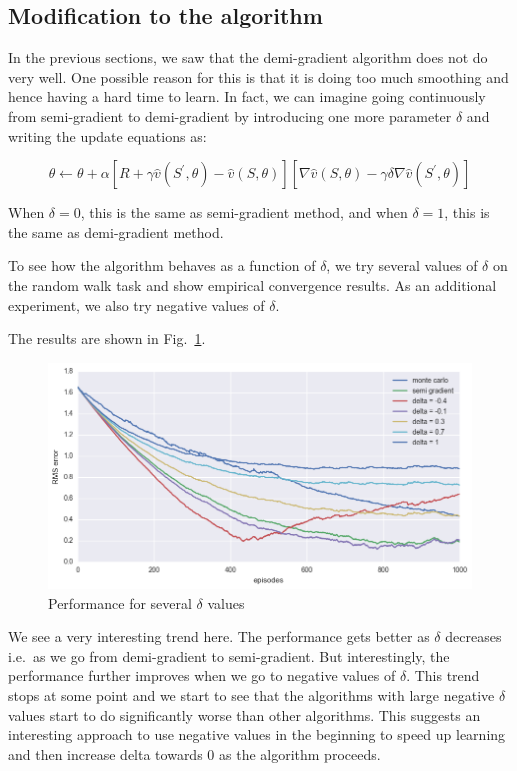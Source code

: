 \documentclass{article}
\begin{document}
\subsection{Modification to the algorithm}

    In the previous sections, we saw that the demi-gradient algorithm does not do very well. One possible reason for this is that it is doing too much smoothing and hence having a hard time to learn. In fact, we can imagine going continuously from semi-gradient to demi-gradient by introducing one more parameter $\delta$ and writing the update equations as:

    $$\theta \leftarrow \theta + \alpha \left[ R + \gamma \hat{v}(S^{'}, \theta) - \hat{v}(S, \theta) \right] \left[ \nabla \hat{v}(S, \theta) - \gamma \delta \nabla \hat{v}(S^{'}, \theta) \right]$$

    When $\delta = 0$, this is the same as semi-gradient method, and when $\delta=1$, this is the same as demi-gradient method.

    To see how the algorithm behaves as a function of $\delta$, we try several values of $\delta$ on the random walk task and show empirical convergence results. As an additional experiment, we also try negative values of $\delta$.

    The results are shown in Fig.~\ref{fig:qc2}.
    \begin{figure}
        \centering
        \includegraphics[width=\textwidth]{quant_comp2}
        \caption{Performance for several $\delta$ values}\label{fig:qc2}
    \end{figure}
    We see a very interesting trend here. The performance gets better as $\delta$ decreases i.e.\ as we go from demi-gradient to semi-gradient. But interestingly, the performance further improves when we go to negative values of $\delta$. This trend stops at some point and we start to see that the algorithms with large negative $\delta$ values start to do significantly worse than other algorithms. This suggests an interesting approach to use negative values in the beginning to speed up learning and then increase delta towards $0$ as the algorithm proceeds.
\end{document}
